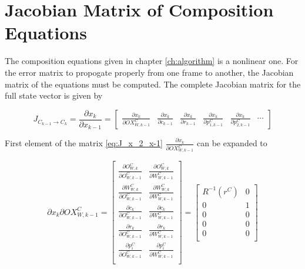\chapter{Jacobian Matrix of Composition Equations}\label{ch:appendix4}

The composition equations given in chapter \ref{ch:algorithm} is a
nonlinear one. For the error matrix to propogate properly from one
frame to another, the Jacobian matrix of the equations must be
computed. The complete Jacobian matrix for the full state vector is
given by 

\begin{equation}
\label{eq:J_x_2_x-1}
 J_{C_{k-1} \to C_k} = \frac{\partial x_{k}}{\partial x_{k-1}}=
\begin{bmatrix} 
\frac{\partial x_{k}}{\partial OX_{W, k-1}^{C}} &
\frac{\partial x_{k}}{\partial c_{k-1}} & 
\frac{\partial x_{k}}{\partial r_{k-1}} & 
\frac{\partial x_{k}}{\partial p_{1, k-1}^{C}} &
\frac{\partial x_{k}}{\partial p_{2, k-1}^{C}} &
\cdots 
\end{bmatrix}
\end{equation}


First element of the matrix \ref{eq:J_x_2_x-1} $\frac{\partial
  x_{k}}{\partial OX_{W, k-1}^{C}}$ can be expanded to

$$
{\partial x_{k}}{\partial OX_{W, k-1}^{C}}=\begin{bmatrix}
\frac{\partial O_{W,k}^{C}}{\partial O_{W,k-1}^{C}} & 
\frac{\partial O_{W,k}^{C}}{\partial W_{W,k-1}^{C}} \\
\frac{\partial W_{W,k}^{C}}{\partial O_{W,k-1}^{C}} & 
\frac{\partial W_{W,k}^{C}}{\partial W_{W,k-1}^{C}} \\
\frac{\partial c_{k}}{\partial O_{W,k-1}^{C}} & 
\frac{\partial c_{k}}{\partial W_{W,k-1}^{C}} \\
\frac{\partial r_{k}}{\partial O_{W,k-1}^{C}} & 
\frac{\partial r_{k}}{\partial W_{W,k-1}^{C}} \\
\frac{\partial p_{i}^{C}}{\partial O_{W,k-1}^{C}} & 
\frac{\partial p_{i}^{C}}{\partial W_{W,k-1}^{C}} \\
\end{bmatrix} = \begin{bmatrix}
R^{-1}(r^{C}) & 0 \\
0 & 1 \\
0 & 0 \\
0 & 0 \\
0 & 0 \\
\end{bmatrix}
$$

